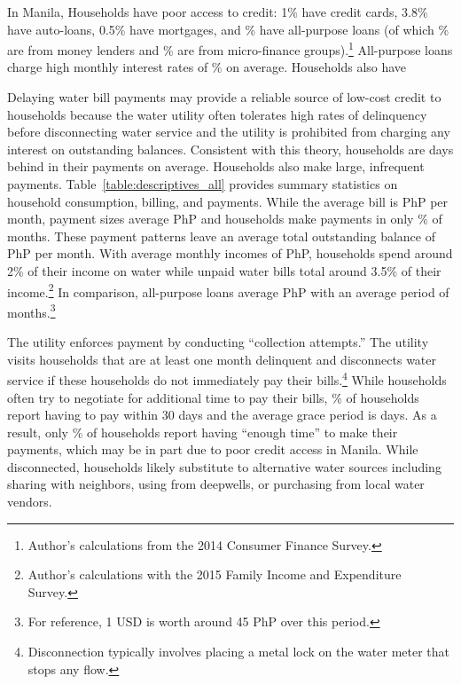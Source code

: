\documentclass[12pt]{article}
\begin{document}

In Manila, Households have poor access to credit: 1\% have credit cards, 3.8\% have auto-loans, 0.5\% have mortgages, and \unskip\% have all-purpose loans (of which \unskip\% are from money lenders and \unskip\% are from micro-finance groups).\footnote{Author's calculations from the 2014 Consumer Finance Survey.}  All-purpose loans charge high monthly interest rates of \unskip\% on average.  Households also have 

Delaying water bill payments may provide a reliable source of low-cost credit to households because the water utility often tolerates high rates of delinquency before disconnecting water service and the utility is prohibited from charging any interest on outstanding balances.  Consistent with this theory, households are days behind in their payments on average.  Households also make large, infrequent payments.  Table~\ref{table:descriptives_all} provides summary statistics on household consumption, billing, and payments.  While the average bill is PhP per month, payment sizes average PhP and households make payments in only \unskip\% of months.  These payment patterns leave an average total outstanding balance of PhP per month.  With average monthly incomes of PhP, households spend around 2\% of their income on water while unpaid water bills total around 3.5\% of their income.\footnote{Author's calculations with the 2015 Family Income and Expenditure Survey.}  In comparison, all-purpose loans average PhP with an average period of months.\footnote{For reference, 1 USD is worth around 45 PhP over this period.}  

The utility enforces payment by conducting ``collection attempts.''  The utility visits households that are at least one month delinquent and disconnects water service if these households do not immediately pay their bills.\footnote{Disconnection typically involves placing a metal lock on the water meter that stops any flow.}  While households often try to negotiate for additional time to pay their bills, \unskip\% of households report having to pay within 30 days and the average grace period is days.  As a result, only \unskip\% of households report having ``enough time'' to make their payments, which may be in part due to poor credit access in Manila.  While disconnected, households likely substitute to alternative water sources including sharing with neighbors, using from deepwells, or purchasing from local water vendors.  
\end{document}
